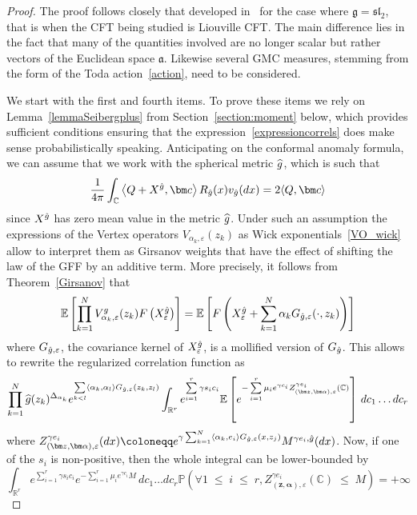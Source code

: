 \documentclass[AHL,Unicode,longabstracts,published]{cedram}
\renewcommand{\leq}{\;\leqslant\;}
\newcommand{\frksl}{\mathfrak{sl}}
\newcommand{\frkg}{\mathfrak{g}}
\newcommand{\frka}{\mathfrak{a}}
\newcommand{\C}{\mathbb{C}}
\newcommand{\R}{\mathbb{R}}
\newcommand{\E}{\mathbb{E}}
\newcommand{\bbP}{\mathbb{P}}
\newcommand{\ps}[1]{\langle #1 \rangle}
\newcommand*\eps{\varepsilon}
\newcommand*\green[1]{#1}
\newcommand{\expect}[1]{\mathbb{E}\left[#1\right]}
\let\oldhat\hat
\renewcommand*{\hat}[1]{\mathchoice{\widehat{#1}}{\widehat{#1}}{\oldhat{#1}}{\oldhat{#1}}}
\let\oldforall\forall
\renewcommand*{\forall}{\mathrel{\oldforall}}
\begin{document}
\begin{proof}
The proof follows closely that developed in~\cite{DKRV} for the case where $\frkg=\frksl_2$, that is when the CFT being studied is Liouville CFT. The main difference lies in the fact that many of the quantities involved are no longer scalar but rather vectors of the Euclidean space $\frka$. Likewise several GMC measures, stemming from the form of the Toda action~\eqref{action}, need to be considered.

We start with the first and fourth items. To prove these items we rely on Lemma~\ref{lemmaSeibergplus} from Section~\ref{section:moment} below, which provides sufficient conditions ensuring that the expression~\eqref{expressioncorrels} does make sense probabilistically speaking. Anticipating on the conformal anomaly formula, we can assume that we work with the spherical metric $\hat g$, which is such that
\[
{\frac{1}{4 \pi} \int_{\C} \left\langle Q+X^{\hat g}, \bm c \right\rangle R_{\hat g} (x) v_{\hat g}(dx)=2\ps{Q,\bm c}}
\]
since $X^{\hat g}$ has zero mean value in the metric $\hat g$. Under such an assumption the expressions of the Vertex operators $V_{\alpha_k,\eps}(z_k)$ as Wick exponentials~\eqref{VO_wick} allow to interpret them as Girsanov weights that have the effect of shifting the law of the GFF by an additive term. More precisely, it follows from Theorem~\ref{Girsanov} that
\begin{align}\label{eq:girsanov_VO}
\expect{\prod_{k=1}^N V^g_{\alpha_k,\eps}(z_k) F\left(X_\eps^{\hat g}\right)}=\expect{F\left(X_\eps^{\hat g}+\sum_{k=1}^N\alpha_kG_{\hat g,\eps}(\cdot,z_k)\right)}
\end{align}
where $G_{\hat{g},\eps}$, the covariance kernel of $X^{\hat g}_\eps$, is a mollified version of $G_{\hat{g}}$. This allows to rewrite the regularized correlation function as
\[
\prod_{k=1}^N \hat g (z_k)^{\Delta_{\alpha_k}}e^{ \sum\limits_{ k < l} \left\langle\alpha_k,\alpha_l \right\rangle G_{\hat g,\eps}(z_k,z_l) }\int_{ \R^{r}} e^{\sum\limits_{i=1}^{r}\gamma s_i c_i}\E \left[e^{- \sum\limits_{i=1}^{r} \mu_i e^{\gamma c_i }Z_{\left(\bm z,\bm \alpha\right),\eps}^{\gamma e_i} (\C)} \right]\,dc_1\dots dc_{r}
\]
where $Z_{(\bm z,\bm \alpha),\eps}^{\gamma e_i} (dx)\coloneqq e^{\gamma \sum_{k=1}^N \langle\alpha_k,e_i \rangle G_{\hat{g},\eps} (x,z_j) } M^{\gamma e_i,\hat g}(dx) $. Now, if one of the $s_i$ is non-positive, then the whole integral can be lower-bounded by
\[
\int_{ \R^{r}} e^{\sum\limits_{i=1}^{r}\green\gamma s_i c_i} e^{-\sum\limits_{i=1}^{r} \mu_i e^{\gamma c_i }M}\,dc_1\dots dc_{r}\bbP\left(\forall 1\leq i\leq r,Z_{(\bm z,\bm \alpha),\eps}^{\gamma e_i} (\C) \leq M\right)=+\infty
\]
\end{proof}
\end{document}
